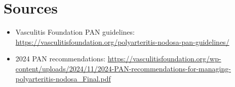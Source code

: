 \section*{Sources}
\begin{itemize}
\item Vasculitis Foundation PAN guidelines: \url{https://vasculitisfoundation.org/polyarteritis-nodosa-pan-guidelines/}
\item 2024 PAN recommendations: \url{https://vasculitisfoundation.org/wp-content/uploads/2024/11/2024-PAN-recommendations-for-managing-polyarteritis-nodosa_Final.pdf}
\end{itemize}
